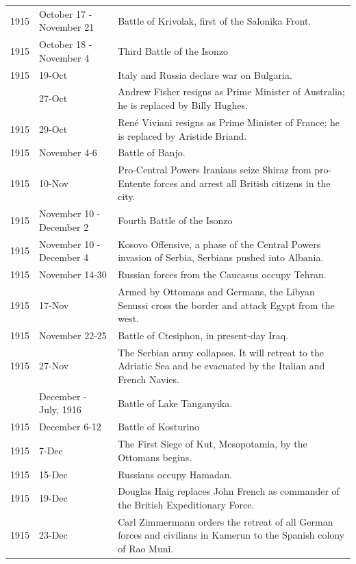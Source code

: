 \documentclass[
  openany]{book}
\begin{document}
\begin{longtable}[t]{rl>{\raggedright\arraybackslash}p{22em}}
\rowcolor{gray!6}  1915 & October 17 - November 21 & Battle of Krivolak, first of the Salonika Front.\\
1915 & October 18 - November 4 & Third Battle of the Isonzo\\
\rowcolor{gray!6}  1915 & 19-Oct & Italy and Russia declare war on Bulgaria.\\
\addlinespace
1915 & 27-Oct & Andrew Fisher resigns as Prime Minister of Australia; he is replaced by Billy Hughes.\\
\rowcolor{gray!6}  1915 & 29-Oct & René Viviani resigns as Prime Minister of France; he is replaced by Aristide Briand.\\
1915 & November 4-6 & Battle of Banjo.\\
\rowcolor{gray!6}  1915 & 10-Nov & Pro-Central Powers Iranians seize Shiraz from pro-Entente forces and arrest all British citizens in the city.\\
1915 & November 10 - December 2 & Fourth Battle of the Isonzo\\
\addlinespace
\rowcolor{gray!6}  1915 & November 10 - December 4 & Kosovo Offensive, a phase of the Central Powers invasion of Serbia, Serbians pushed into Albania.\\
1915 & November 14-30 & Russian forces from the Caucasus occupy Tehran.\\
\rowcolor{gray!6}  1915 & 17-Nov & Armed by Ottomans and Germans, the Libyan Senussi cross the border and attack Egypt from the west.\\
1915 & November 22-25 & Battle of Ctesiphon, in present-day Iraq.\\
\rowcolor{gray!6}  1915 & 27-Nov & The Serbian army collapses. It will retreat to the Adriatic Sea and be evacuated by the Italian and French Navies.\\
\addlinespace
1915 & December - July, 1916 & Battle of Lake Tanganyika.\\
\rowcolor{gray!6}  1915 & December 6-12 & Battle of Kosturino\\
1915 & 7-Dec & The First Siege of Kut, Mesopotamia, by the Ottomans begins.\\
\rowcolor{gray!6}  1915 & 15-Dec & Russians occupy Hamadan.\\
1915 & 19-Dec & Douglas Haig replaces John French as commander of the British Expeditionary Force.\\
\addlinespace
\rowcolor{gray!6}  1915 & 23-Dec & Carl Zimmermann orders the retreat of all German forces and civilians in Kamerun to the Spanish colony of Rao Muni.\\

\end{longtable}
\end{document}
